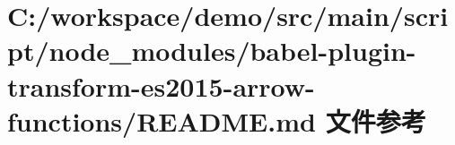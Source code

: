 \hypertarget{node__modules_2babel-plugin-transform-es2015-arrow-functions_2_r_e_a_d_m_e_8md}{}\section{C\+:/workspace/demo/src/main/script/node\+\_\+modules/babel-\/plugin-\/transform-\/es2015-\/arrow-\/functions/\+R\+E\+A\+D\+ME.md 文件参考}
\label{node__modules_2babel-plugin-transform-es2015-arrow-functions_2_r_e_a_d_m_e_8md}
